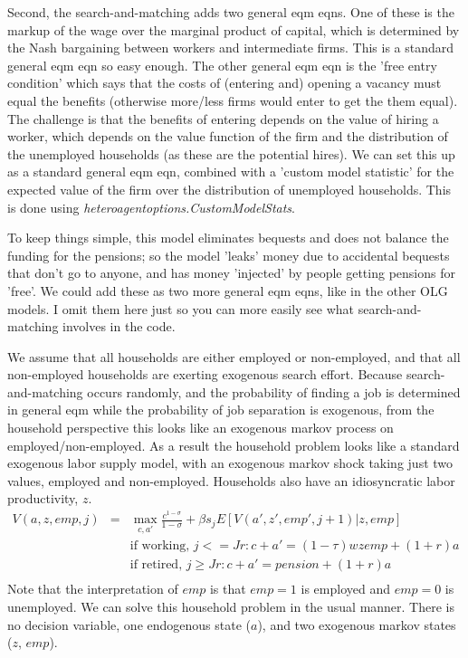Second, the search-and-matching adds two general eqm eqns. One of these is the markup of the wage over the marginal product of capital, which is determined by the Nash bargaining between workers and intermediate firms. This is a standard general eqm eqn so easy enough. The other general eqm eqn is the 'free entry condition' which says that the costs of (entering and) opening a vacancy must equal the benefits (otherwise more/less firms would enter to get the them equal). The challenge is that the benefits of entering depends on the value of hiring a worker, which depends on the value function of the firm and the distribution of the unemployed households (as these are the potential hires). We can set this up as a standard general eqm eqn, combined with a 'custom model statistic' for the expected value of the firm over the distribution of unemployed households. This is done using \textit{heteroagentoptions.CustomModelStats}.

To keep things simple, this model eliminates bequests and does not balance the funding for the pensions; so the model 'leaks' money due to accidental bequests that don't go to anyone, and has money 'injected' by people getting pensions for 'free'. We could add these as two more general eqm eqns, like in the other OLG models. I omit them here just so you can more easily see what search-and-matching involves in the code.

We assume that all households are either employed or non-employed, and that all non-employed households are exerting exogenous search effort. Because search-and-matching occurs randomly, and the probability of finding a job is determined in general eqm while the probability of job separation is exogenous, from the household perspective this looks like an exogenous markov process on employed/non-employed. As a result the household problem looks like a standard exogenous labor supply model, with an exogenous markov shock taking just two values, employed and non-employed. Households also have an idiosyncratic labor productivity, $z$.
\begin{eqnarray*}
 V(a,z,emp,j)&=& \max_{c,a'} \frac{c^{1-\sigma}}{1-\sigma} + \beta s_j E[V(a',z',emp',j+1)|z,emp] \\
&&\text{if working, }j<=Jr: c+a'= (1-\tau) w z emp + (1+r) a \\
&&\text{if retired, }j\geq Jr: c+a'=pension+ (1+r) a  \\
\end{eqnarray*}
Note that the interpretation of $emp$ is that $emp=1$ is employed and $emp=0$ is unemployed. We can solve this household problem in the usual manner. There is no decision variable, one endogenous state ($a$), and two exogenous markov states ($z$, $emp$).

